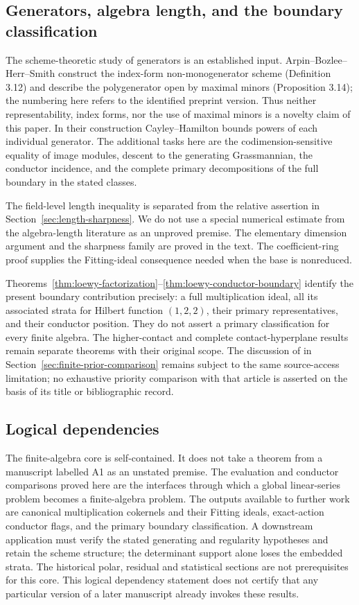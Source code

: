 \subsection{Generators, algebra length, and the boundary classification}
\label{sec:v120-literature-position}
The scheme-theoretic study of generators is an established input.
Arpin--Bozlee--Herr--Smith \cite{ABHS} construct the index-form
non-monogenerator scheme (Definition 3.12) and describe the
polygenerator open by maximal minors (Proposition 3.14); the numbering
here refers to the identified preprint version. Thus neither
representability, index forms, nor the use of maximal minors is a
novelty claim of this paper. In their construction Cayley--Hamilton
bounds powers of each individual generator. The additional tasks here
are the codimension-sensitive equality of image modules, descent to
the generating Grassmannian, the conductor incidence, and the complete
primary decompositions of the full boundary in the stated classes.

The field-level length inequality is separated from the relative
assertion in Section~\ref{sec:length-sharpness}. We do not use a
special numerical estimate from the algebra-length literature as an
unproved premise. The elementary dimension argument and the sharpness
family are proved in the text. The coefficient-ring proof supplies
the Fitting-ideal consequence needed when the base is nonreduced.

Theorems~\ref{thm:loewy-factorization}--\ref{thm:loewy-conductor-boundary}
identify the present boundary contribution precisely: a full
multiplication ideal, all its associated strata for Hilbert function
$(1,2,2)$, their primary representatives, and their conductor position.
They do not assert a primary classification for every finite algebra.
The higher-contact and complete contact-hyperplane results remain
separate theorems with their original scope. The discussion of
\cite{Ballico93} in Section~\ref{sec:finite-prior-comparison} remains
subject to the same source-access limitation; no exhaustive priority
comparison with that article is asserted on the basis of its title
or bibliographic record.

\subsection{Logical dependencies}
The finite-algebra core is self-contained. It does not take a theorem
from a manuscript labelled A1 as an unstated premise. The evaluation
and conductor comparisons proved here are the interfaces through which
a global linear-series problem becomes a finite-algebra problem.
The outputs available to further work are canonical multiplication
cokernels and their Fitting ideals, exact-action conductor flags, and
the primary boundary classification. A downstream application must
verify the stated generating and regularity hypotheses and retain the
scheme structure; the determinant support alone loses the embedded
strata. The historical polar, residual and statistical sections are
not prerequisites for this core. This logical dependency statement
does not certify that any particular version of a later manuscript
already invokes these results.
